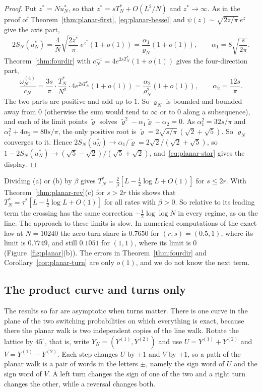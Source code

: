 \begin{proof}
Put $z^*=Nu^*_N$, so that $z^*=sT^*_N+O(L^2/N)$ and $z^*\to\infty$. As in the proof of
Theorem~\ref{thm:planar-first}, \eqref{eq:planar-bessel} and $\psi(z)\sim\sqrt{2z/\pi}\,e^z$ give
the axis part,
\[
 2S_N(u^*_N)=\frac4N\sqrt{\frac{2z^*}\pi}\,e^{z^*}(1+o(1))=\frac{\alpha_1}{\varrho_N}(1+o(1)),
 \qquad \alpha_1=8\sqrt{\frac s{2\pi}}.
\]
Theorem~\ref{thm:fourdir} with $c_N^{-1}=4e^{2sT^*_N}(1+o(1))$ gives the four-direction part,
\[
 \frac{\omega^{(4)}_N}{c_N}=\frac{3s}\pi\cdot\frac{T^*_N}{N^2}\cdot4e^{2sT^*_N}(1+o(1))
 =\frac{\alpha_2}{\varrho_N^2}(1+o(1)),\qquad \alpha_2=\frac{12s}\pi.
\]
The two parts are positive and add up to $1$. So $\varrho_N$ is bounded and bounded away from $0$
(otherwise the sum would tend to $\infty$ or to $0$ along a subsequence), and each of its limit
points $\tilde\varrho$ solves $\tilde\varrho^2-\alpha_1\tilde\varrho-\alpha_2=0$. As $\alpha_1^2=32s/\pi$ and
$\alpha_1^2+4\alpha_2=80s/\pi$, the only positive root is $\tilde\varrho=2\sqrt{s/\pi}\,(\sqrt2+\sqrt5)$. So
$\varrho_N$ converges to it. Hence
$2S_N(u^*_N)\to\alpha_1/\tilde\varrho=2\sqrt2/(\sqrt2+\sqrt5)$, so
$1-2S_N(u^*_N)\to(\sqrt5-\sqrt2)/(\sqrt5+\sqrt2)$, and~\eqref{eq:planar-star} gives the display.
\end{proof}

Dividing (a) or (b) by $\beta$ gives $T^*_N=\frac2\beta[L-\frac12\log L+O(1)]$ for $s\le2r$. With
Theorem~\ref{thm:planar-rev}(c) for $s>2r$ this shows that
$T^*_N=\tau^*[L-\frac12\log L+O(1)]$ for all rates with $\beta>0$. So relative to its leading
term the crossing has the same correction $-\frac12\log\log N$ in every regime, as on the
line.
The approach to these limits is slow. In numerical computations of the exact law at $N=10240$ the zero-turn share is $0.7650$ for
$(r,s)=(0.5,1)$, where its limit is $0.7749$, and still $0.1051$ for $(1,1)$, where its limit is $0$
(Figure~\ref{fig:planar}(b)). The errors in Theorem~\ref{thm:fourdir} and
Corollary~\ref{cor:planar-turn} are only $o(1)$, and we do not know the next term.

\subsection{The product curve and turns only}\label{sec:product}

The results so far are asymptotic when turns matter. There is one curve in the plane of the two
switching probabilities on which everything is exact, because there the planar walk is two
independent copies of the line walk. Rotate the lattice by $45^\circ$, that is, write
$Y_N=(Y^{(1)},Y^{(2)})$ and use $U=Y^{(1)}+Y^{(2)}$ and $V=Y^{(1)}-Y^{(2)}$. Each step changes $U$ by
$\pm1$ and $V$ by $\pm1$, so a path of the planar walk is a pair of words in the letters $\pm$,
namely the sign word of $U$ and the sign word of $V$. A left turn changes the sign of one of the two
and a right turn changes the other, while a reversal changes both.

